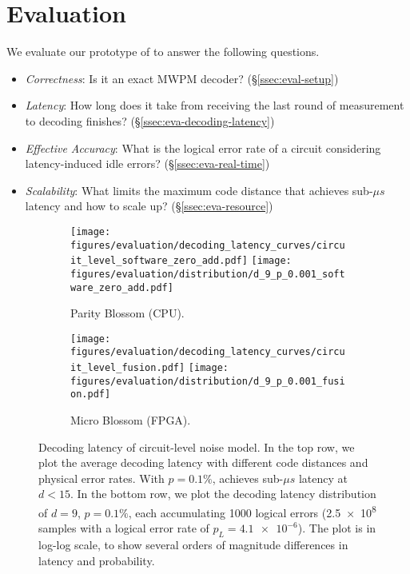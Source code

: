 \section{Evaluation}\label{sec:evaluation}

We evaluate our prototype of \system to answer the following questions.

\begin{itemize}
    \item \emph{Correctness}: Is it an exact MWPM decoder? (\S\ref{ssec:eval-setup})
    \item \emph{Latency}: How long does it take from receiving the last round of measurement to decoding finishes? (\S\ref{ssec:eva-decoding-latency})
    \item \emph{Effective Accuracy}: What is the logical error rate of a circuit considering latency-induced idle errors? (\S\ref{ssec:eva-real-time})
    \item \emph{Scalability}: What limits the maximum code distance that achieves sub-$\mu s$ latency and how to scale up? (\S\ref{ssec:eva-resource})
\end{itemize}

\begin{figure}[tb]
    \centering
    \begin{minipage}{\linewidth}
        \newcommand{\subsubfigurewidth}{0.95\linewidth}
        \renewcommand*\thesubfigure{\alph{subfigure}}  %
        \centering
        \begin{subfigure}{.536\linewidth}
            \centering
            \texttt{[image: figures/evaluation/decoding\_latency\_curves/circuit\_level\_software\_zero\_add.pdf]}
            \texttt{[image: figures/evaluation/distribution/d\_9\_p\_0.001\_software\_zero\_add.pdf]}
            \caption{Parity Blossom (CPU).}
            \label{fig:circuit-level-software}
        \end{subfigure}
        \begin{subfigure}{.446\linewidth}
            \centering
            \texttt{[image: figures/evaluation/decoding\_latency\_curves/circuit\_level\_fusion.pdf]}
            \texttt{[image: figures/evaluation/distribution/d\_9\_p\_0.001\_fusion.pdf]}
            \caption{Micro Blossom (FPGA).}
            \label{fig:circuit-level-fusion}
        \end{subfigure}
        \caption{Decoding latency of circuit-level noise model. In the top row, we plot the average decoding latency with different code distances and physical error rates. With $p=0.1\%$, \system achieves sub-$\mu s$ latency at $d< 15$. In the bottom row, we plot the decoding latency distribution of $d=9$, $p=0.1\%$, each accumulating 1000 logical errors (\num{2.5e8} samples with a logical error rate of $p_L=\num{4.1e-6}$). The plot is in log-log scale, to show several orders of magnitude differences in latency and probability.}
        \label{fig:eva-decoding-latency}
    \end{minipage}
\end{figure}


